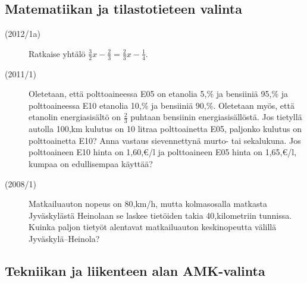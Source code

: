 \begin{description}
    	\begin{alakohdat}
    	\end{alakohdat}	 	
	
\end{description}

\subsection*{Matematiikan ja tilastotieteen valinta}

\begin{description}
	\item[(2012/1a)] Ratkaise yhtälö $\frac{3}{2}x - \frac{2}{3} = \frac{2}{3}x - \frac{1}{4}$.
	\item[(2011/1)] Oletetaan, että polttoaineessa E05 on etanolia 5,\% ja
        bensiiniä 95,\% ja polttoaineessa E10 etanolia 10,\% ja bensiiniä 90,\%.
        Oletetaan myös, että etanolin energiasisältö on $\frac{2}{3}$ puhtaan bensiinin
		energiasisällöstä. Jos tietyllä autolla 100,km kulutus on 10 litraa
        polttoainetta E05, paljonko kulutus on polttoainetta E10? Anna vastaus
        sievennettynä murto- tai sekalukuna. Jos polttoaineen E10 hinta on 1,60,€/l
        ja polttoaineen E05 hinta on 1,65,€/l, kumpaa on edullisempaa käyttää?
	\item[(2008/1)] Matkailuauton nopeus on 80,km/h, mutta kolmasosalla matkasta
        Jyväskylästä Heinolaan se laskee tietöiden takia 40,kilometriin tunnissa.
        Kuinka paljon tietyöt alentavat matkailuauton keskinopeutta välillä Jyväskylä--Heinola?
\end{description}

\subsection*{Tekniikan ja liikenteen alan AMK-valinta}

